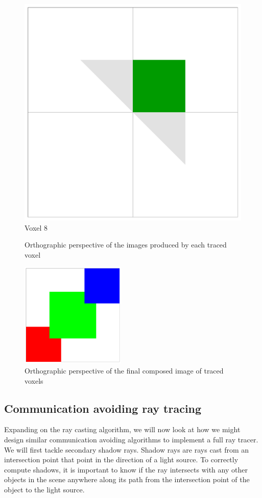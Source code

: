 \begin{figure}[!htb]
  \includegraphics[width=\linewidth]{drawings/cubes_08.pdf}
  Voxel 8
\endminipage
\caption{Orthographic perspective of the images produced by each traced voxel}
\label{fig:cubes}
\end{figure}

\begin{figure}[!htb]
\centering
  \includegraphics[height=5cm]{drawings/cube_final.pdf}
\caption{Orthographic perspective of the final composed image of traced voxels}
\label{fig:cubes_final}
\end{figure}


\subsection{Communication avoiding ray tracing}
\label{sec:ca-ray-tracing}

Expanding on the ray casting algorithm, we will now look at how we might design 
similar communication avoiding algorithms to implement a full ray tracer.  We 
will first tackle secondary shadow rays.  Shadow rays are rays cast from an 
intersection point that point in the direction of a light source.  To correctly 
compute shadows, it is important to know if the ray intersects with any other 
objects in the scene anywhere along its path from the intersection point of the 
object to the light source.  

